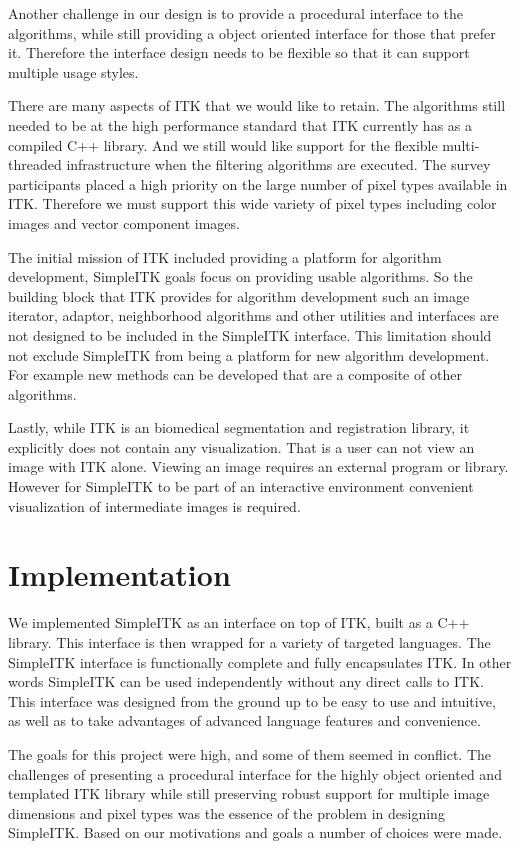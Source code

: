 \documentclass{frontiersMED} %
\begin{document}
Another challenge in our design is to provide a procedural interface
to the algorithms, while still providing a object oriented interface for those
that prefer it. Therefore the interface design needs to be flexible so
that it can support multiple usage styles.

There are many aspects of ITK that we would like to retain. The
algorithms still needed to be at the high performance standard that
ITK currently has as a compiled C++ library. And we still would like
support for the flexible multi-threaded infrastructure when the
filtering algorithms are executed. The survey participants placed a
high priority on the large number of pixel types available in
ITK. Therefore we must support this wide variety of pixel types
including color images and vector component images.

The initial mission of ITK included providing a platform for algorithm
development, SimpleITK goals focus on providing usable algorithms. So
the building block that ITK provides for algorithm development such an
image iterator, adaptor, neighborhood algorithms and other utilities
and interfaces are not designed to be included in the SimpleITK
interface. This limitation should not exclude SimpleITK from being a platform for
new algorithm development. For example new methods can be
developed that are a composite of other algorithms.

Lastly, while ITK is an biomedical segmentation and registration
library, it explicitly does not contain any visualization. That is a
user can not view an image with ITK alone. Viewing an image requires
an external program or library. However for SimpleITK to be part of an
interactive environment convenient visualization of intermediate
images is required.

\section{Implementation}

We implemented SimpleITK as an interface on top of ITK, built as a C++
library. This interface is then wrapped for a variety of targeted
languages. The SimpleITK interface is functionally complete and fully
encapsulates ITK.  In other words SimpleITK can be used independently
without any direct calls to ITK. This interface was designed from the
ground up to be easy to use and intuitive, as well as to take
advantages of advanced language features and convenience.

The goals for this project were high, and some of them seemed in
conflict. The challenges of presenting a procedural interface for the
highly object oriented and templated ITK library while still
preserving robust support for multiple image dimensions and pixel
types was the essence of the problem in designing SimpleITK. Based on
our motivations and goals a number of choices were made.
\end{document}
